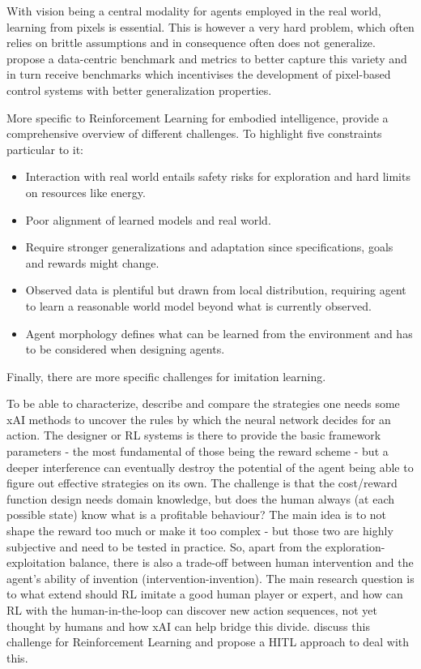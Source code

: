\documentclass[twoside,11pt]{article}
\begin{document}
With vision being a central modality for agents employed in the real world, learning from pixels is essential. This is however a very hard problem, which often relies on brittle assumptions and in consequence often does not generalize. \citet{TomarEtAl:2021:LearnPixelControlRepresentations} propose a data-centric benchmark and metrics to better capture this variety and in turn receive benchmarks which incentivises the development of pixel-based control systems with better generalization properties. 


More specific to Reinforcement Learning for embodied intelligence, \cite{RoyEtAl:2021:RLRoboticsChallenges} provide a comprehensive overview of different challenges. To highlight five constraints particular to it:
\begin{itemize}
    \item Interaction with real world entails safety risks for exploration and hard limits on resources like energy.
    \item Poor alignment of learned models and real world.
    \item Require stronger generalizations  and adaptation since specifications, goals and rewards might change.
    \item Observed data is plentiful but drawn from local distribution, requiring agent to learn a reasonable world model beyond  what is currently observed. 
    \item Agent morphology defines what can be learned from the environment and has to be considered when designing agents.
\end{itemize}

Finally, there are more specific challenges for imitation learning. 

To be able to characterize, describe and compare the strategies one needs some xAI methods to uncover the rules by which the neural network decides for an action. The designer or RL systems is there to provide the basic framework parameters - the most fundamental of those being the reward scheme - but a deeper interference can eventually destroy the potential of the agent being able to figure out effective strategies on its own. The challenge is that the cost/reward function design needs domain knowledge, but does the human always (at each possible state) know what is a profitable behaviour? The main idea is to not shape the reward too much or make it too complex - but those two are highly subjective and need to be tested in practice. So, apart from the exploration-exploitation balance, there is also a trade-off between human intervention and the agent's ability of invention (intervention-invention). The main research question is to what extend should RL imitate a good human player or expert, and how can RL with the human-in-the-loop can discover new action sequences, not yet thought by humans and how xAI can help bridge this divide. \cite{LeeSmithAbbeel:2021:FeedbackPreferenceHITLLearningPEBBLE} discuss this challenge for Reinforcement Learning and propose a HITL approach to deal with this.
\end{document}
